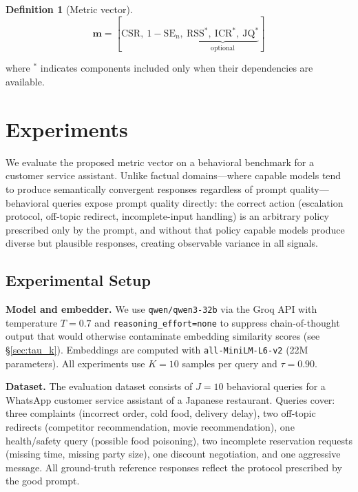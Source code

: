 \documentclass[11pt,a4paper]{article}
\newtheorem{definition}{Definition}
\begin{document}
\begin{definition}[Metric vector]
\[
\mathbf{m} = \left[\mathrm{CSR},\ 1 - \mathrm{SE}_n,\ \underbrace{\mathrm{RSS}^*,\ \mathrm{ICR}^*,\ \mathrm{JQ}^*}_{\text{optional}}\right]
\]
\end{definition}

\noindent where ${}^*$ indicates components included only when their dependencies are available.

\section{Experiments}
\label{sec:experiments}

We evaluate the proposed metric vector on a behavioral benchmark for a customer service assistant. Unlike factual domains---where capable models tend to produce semantically convergent responses regardless of prompt quality---behavioral queries expose prompt quality directly: the correct action (escalation protocol, off-topic redirect, incomplete-input handling) is an arbitrary policy prescribed only by the prompt, and without that policy capable models produce diverse but plausible responses, creating observable variance in all signals.

\subsection{Experimental Setup}

\textbf{Model and embedder.} We use \texttt{qwen/qwen3-32b} via the Groq API with temperature $T = 0.7$ and \texttt{reasoning\_effort=none} to suppress chain-of-thought output that would otherwise contaminate embedding similarity scores (see \S\ref{sec:tau_k}). Embeddings are computed with \texttt{all-MiniLM-L6-v2} (22M parameters). All experiments use $K = 10$ samples per query and $\tau = 0.90$.

\textbf{Dataset.} The evaluation dataset consists of $J = 10$ behavioral queries for a WhatsApp customer service assistant of a Japanese restaurant. Queries cover: three complaints (incorrect order, cold food, delivery delay), two off-topic redirects (competitor recommendation, movie recommendation), one health/safety query (possible food poisoning), two incomplete reservation requests (missing time, missing party size), one discount negotiation, and one aggressive message. All ground-truth reference responses reflect the protocol prescribed by the good prompt.
\end{document}
